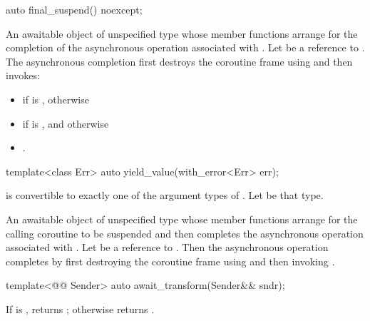 %
\begin{itemdecl}
auto final_suspend() noexcept;
\end{itemdecl}
\begin{itemdescr}
\pnum
\returns
An awaitable object of unspecified type whose
member functions arrange for the completion of the asynchronous
operation associated with .
Let  be a reference to .
The asynchronous completion first destroys the coroutine frame
using  and then invokes:
\begin{itemize}
\item
{}
if  is , otherwise
\item
{} if  is ,
and otherwise
\item
 .
\end{itemize}
\end{itemdescr}

%
\begin{itemdecl}
template<class Err>
  auto yield_value(with_error<Err> err);
\end{itemdecl}
\begin{itemdescr}
\pnum
\mandates
{} is convertible to exactly one of the
 argument types of .
Let  be that type.

\pnum
\returns
An awaitable object of unspecified type whose
member functions arrange for the calling coroutine to be suspended
and then completes the asynchronous operation associated with
.
Let  be a reference to .
Then the asynchronous operation completes by first
destroying the coroutine frame using 
and then invoking
.
\end{itemdescr}

%
\begin{itemdecl}
template<@@ Sender>
  auto await_transform(Sender&& sndr);
\end{itemdecl}
\begin{itemdescr}
\pnum
\returns
If 
is ,
returns ;
otherwise returns .
\end{itemdescr}

